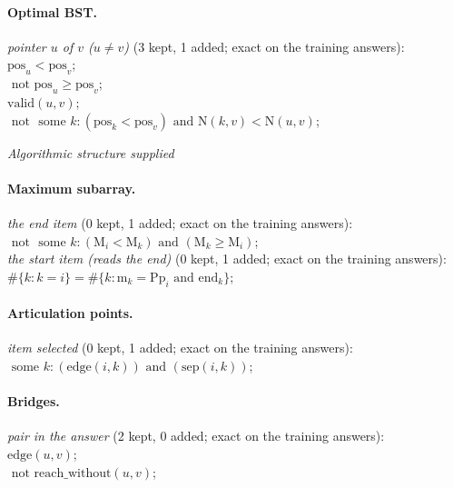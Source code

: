 \documentclass[10pt]{article}
\begin{document}
{\paragraph{Optimal BST.}
\emph{pointer $u$ of $v$ ($u \neq v$)} (3 kept, 1 added; exact on the training answers):\\
\quad $\mathrm{pos}_{u} < \mathrm{pos}_{v}$;\\
\quad $\text{ not } \mathrm{pos}_{u}  \geq  \mathrm{pos}_{v}$;\\
\quad $\mathrm{valid}(u, v)$;\\
\quad $\text{ not } \text{ some } k: (\mathrm{pos}_{k} < \mathrm{pos}_{v}) \text{ and } \mathrm{N}(k, v) < \mathrm{N}(u, v)$;

\medskip\noindent\textit{Algorithmic structure supplied}\par
\paragraph{Maximum subarray.}
\emph{the end item} (0 kept, 1 added; exact on the training answers):\\
\quad $\text{ not } \text{ some } k: (\mathrm{M}_{i} < \mathrm{M}_{k}) \text{ and } (\mathrm{M}_{k}  \geq  \mathrm{M}_{i})$;\\
\emph{the start item (reads the end)} (0 kept, 1 added; exact on the training answers):\\
\quad $\#\{k: k = i\} = \#\{k: \mathrm{m}_{k} = \mathrm{Pp}_{i} \text{ and } \mathrm{end}_{k}\}$;

\paragraph{Articulation points.}
\emph{item selected} (0 kept, 1 added; exact on the training answers):\\
\quad $\text{ some } k: (\mathrm{edge}(i, k)) \text{ and } (\mathrm{sep}(i, k))$;

\paragraph{Bridges.}
\emph{pair in the answer} (2 kept, 0 added; exact on the training answers):\\
\quad $\mathrm{edge}(u, v)$;\\
\quad $\text{ not } \mathrm{reach\_without}(u, v)$;

}
\end{document}
